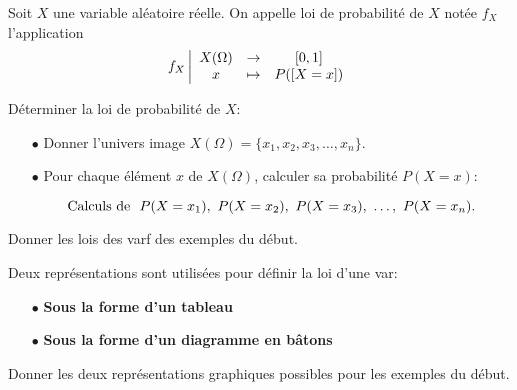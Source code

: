 \documentclass[a4paper, 11pt]{article}
\begin{document}
 {  

\begin{defi} Soit $X$ une variable al\'eatoire r\'eelle.
 On appelle loi de probabilit\'e de $X$ not\'ee $f_X$ l'application
$$f_X \left|\begin{array}{ccc}
 X(\Omega) & \rightarrow &[0,1] \\
x &\mapsto &P([X=x])
\end{array}\right.$$

\end{defi}
 
}
\vsec\vsec

\setlength\fboxrule{1pt}
  {

D\'eterminer la loi de probabilit\'e de $X$:
\begin{itemize}
\item[$\bullet$] Donner l'univers image $X(\Omega)=\lbrace x_1,x_2,x_3,\dots,x_n\rbrace$.
\item[$\bullet$] Pour chaque \'el\'ement $x$ de $X(\Omega)$, calculer sa probabilit\'e $P(X=x)$:

$$\hbox{Calculs de }\ P(X=x_1),\ P(X=x_2),\ P(X=x_3),\ \dots,\ P(X=x_n).$$
\end{itemize}
 }
\setlength\fboxrule{0.5pt}

\begin{exemple}  
Donner les lois des varf des exemples du d\'ebut.
\end{exemple} 


 



 Deux repr\'esentations sont utilis\'ees pour d\'efinir la loi d'une var:
\begin{itemize}
\item[$\bullet$] \textbf{Sous la forme d'un tableau}


\item[$\bullet$] \textbf{Sous la forme d'un diagramme en b\^{a}tons}


\end{itemize}

\begin{exemple}  
Donner les deux repr\'esentations graphiques possibles pour les exemples du d\'ebut.
\end{exemple} 

\end{document}
